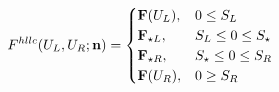 \documentclass[preview]{standalone}
\begin{document}
\begin{align*}
\special{dvisvgm:raw <g id='unique000'>}
            F^{hllc}(U_L,U_R;\mathbf{n}) =
            \begin{cases}
            \mathbf{F}(U_L), & 0 \leq S_L \\
            \mathbf{F}_{\star L}, & S_L \leq 0 \leq S_\star \\
            \mathbf{F}_{\star R}, & S_\star \leq 0 \leq S_R \\
            \mathbf{F}(U_R), & 0 \geq S_R
            \end{cases}
            \special{dvisvgm:raw </g>}
\end{align*}
\end{document}
